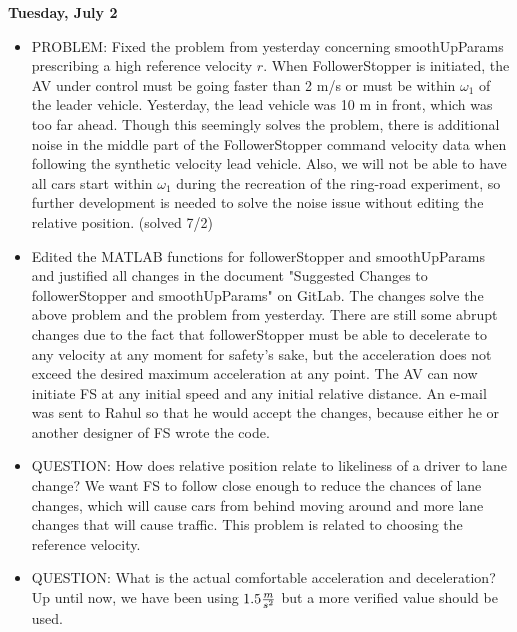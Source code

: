 \documentclass[12pt, letterpaper]{article}
\begin{document}
{\bf Tuesday, July 2} \\
\begin{itemize}
\item PROBLEM: Fixed the problem from yesterday concerning smoothUpParams prescribing a high reference velocity $r$. When FollowerStopper is initiated, the AV under control must be going faster than 2 m/s or must be within $\omega_1$ of the leader vehicle. Yesterday, the lead vehicle was 10 m in front, which was too far ahead. Though this seemingly solves the problem, there is additional noise in the middle part of the FollowerStopper command velocity data when following the synthetic velocity lead vehicle. Also, we will not be able to have all cars start within $\omega_1$ during the recreation of the ring-road experiment, so further development is needed to solve the noise issue without editing the relative position. (solved 7/2)
\item Edited the MATLAB functions for followerStopper and smoothUpParams and justified all changes in the document "Suggested Changes to followerStopper and smoothUpParams" on GitLab. The changes solve the above problem and the problem from yesterday. There are still some abrupt changes due to the fact that followerStopper must be able to decelerate to any velocity at any moment for safety's sake, but the acceleration does not exceed the desired maximum acceleration at any point. The AV can now initiate FS at any initial speed and any initial relative distance. An e-mail was sent to Rahul so that he would accept the changes, because either he or another designer of FS wrote the code.
\item QUESTION: How does relative position relate to likeliness of a driver to lane change? We want FS to follow close enough to reduce the chances of lane changes, which will cause cars from behind moving around and more lane changes that will cause traffic. This problem is related to choosing the reference velocity.
\item QUESTION: What is the actual comfortable acceleration and deceleration? Up until now, we have been using $1.5 {m\over s^2}$ but a more verified value should be used.
\end{itemize}
\end{document}

